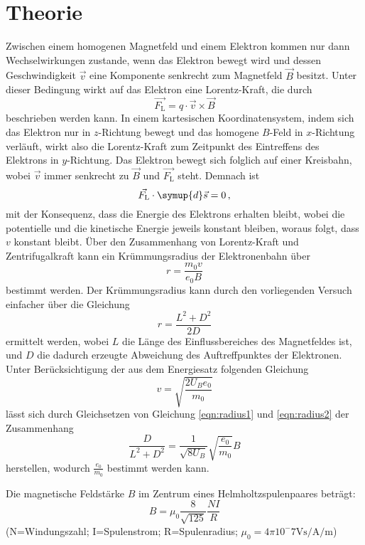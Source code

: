 \section{Theorie}
\label{sec:Theorie}

Zwischen einem homogenen Magnetfeld und einem Elektron kommen nur dann Wechselwirkungen zustande, wenn das Elektron bewegt wird
und dessen Geschwindigkeit $\vec{v}$ eine Komponente senkrecht zum Magnetfeld $\vec{B}$ besitzt. Unter dieser Bedingung wirkt 
auf das Elektron eine Lorentz-Kraft, die durch 
\begin{equation}
    \vec{F_\text{L}} = q\cdot \vec{v} \times \vec{B}
    \label{eqn:lorentz}
\end{equation}
beschrieben werden kann. In einem kartesischen Koordinatensystem, indem sich das Elektron nur in $z$-Richtung bewegt und das
homogene $B$-Feld in $x$-Richtung verläuft, wirkt also die Lorentz-Kraft zum Zeitpunkt des Eintreffens des Elektrons in 
$y$-Richtung. Das Elektron bewegt sich folglich auf einer Kreisbahn, wobei $\vec{v} $ immer 
senkrecht zu $\vec{B} $ und $\vec{F_\text{L}}$ steht. Demnach ist
\begin{equation}
    \vec{F_\text{L}} \cdot \symup{d}\vec{s} = 0\,,
\end{equation}
mit der Konsequenz, dass die Energie des Elektrons erhalten bleibt, wobei die potentielle und die kinetische Energie jeweils 
konstant bleiben, woraus folgt, dass $v$ konstant bleibt. Über den Zusammenhang von Lorentz-Kraft und Zentrifugalkraft kann ein 
Krümmungsradius der Elektronenbahn über 
\begin{equation}
    r = \frac{m_0 v}{e_0 B}
    \label{eqn:radius1}
\end{equation}
bestimmt werden.  
Der Krümmungsradius kann durch den vorliegenden Versuch einfacher über die Gleichung 
\begin{equation}
    r = \frac{L^2 + D^2}{2D}
    \label{eqn:radius2}
\end{equation}
ermittelt werden, wobei $L$ die Länge des Einflussbereiches des Magnetfeldes ist, und $D$ die dadurch erzeugte Abweichung des 
Auftreffpunktes der Elektronen. Unter Berücksichtigung der aus dem Energiesatz folgenden Gleichung 
\begin{equation}
    v = \sqrt{\frac{2 U_B e_0}{m_0}}
\end{equation} 
lässt sich durch Gleichsetzen von Gleichung \ref{eqn:radius1} und \ref{eqn:radius2} der Zusammenhang 
\begin{equation}
\label{eqn:V}
    \frac{D}{L^2 + D^2} = \frac{1}{\sqrt{8U_B}} \sqrt{ \frac{e_0}{m_0}} B
\end{equation}
herstellen, wodurch $\frac{e_0}{m_0}$ bestimmt werden kann. 

Die magnetische Feldstärke $B$ im Zentrum eines Helmholtzspulenpaares beträgt:
\begin{equation}
    B=\mu_0 \frac{8}{\sqrt{125}}\frac{NI}{R}  
    \label{eqn:B}
\end{equation}
    (N=Windungszahl; I=Spulenstrom; R=Spulenradius; $\mu_0=4\pi 10^-7\si{\V\s\per\A\per\m}$)
